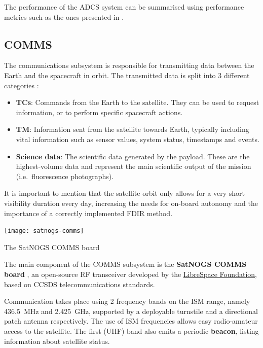 \documentclass[a4paper,nobib,final]{tufte-book}
\begin{document}
The performance of the \ac{ADCS} system can be summarised using performance metrics such as the ones presented in .

\subsection{\acf{COMMS}}

The communications subsystem is responsible for transmitting data between the Earth and the spacecraft in orbit. The transmitted data is split into 3 different categories \autocite{DDJF_TTC}:
\begin{itemize}
	\item \textbf{\acfp{TC}}: Commands from the Earth to the satellite. They can be used to request information, or to perform specific spacecraft actions.
	\item \textbf{\acf{TM}}: Information sent from the satellite towards Earth, typically including vital information such as sensor values, system status, timestamps and events.
	\item \textbf{Science data}: The scientific data generated by the payload. These are the highest-volume data and represent the main scientific output of the mission (i.e.\ fluorescence photographs).
\end{itemize}

It is important to mention that the satellite orbit only allows for a very short visibility duration every day, increasing the needs for on-board autonomy and the importance of a correctly implemented \acs{FDIR} method.

\begin{marginfigure}
	\texttt{[image: satnogs-comms]}
	\caption{The SatNOGS COMMS board}
\end{marginfigure}

The main component of the \acs{COMMS} subsystem is the \textbf{SatNOGS COMMS board} \autocite{surligas_satnogscomms_2021}, an open-source \acs{RF} transceiver developed by the \href{https://libre.space/}{LibreSpace Foundation}, based on \acs{CCSDS} telecommunications standards.

Communication takes place using 2 frequency bands on the \acs{ISM} range, namely \SI{436.5}{\mega\hertz} and \SI{2.425}{\giga\hertz}, supported by a deployable turnstile and a directional patch antenna respectively. The use of \acs{ISM} frequencies allows easy radio-amateur access to the satellite. The first (\acs{UHF}) band also emits a periodic \textbf{beacon}, listing information about satellite status.
\end{document}
